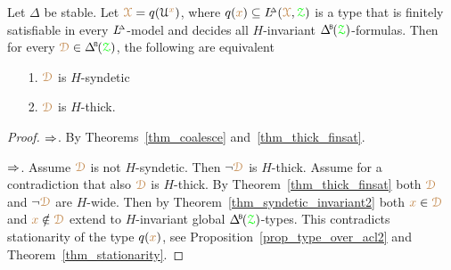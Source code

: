 

\begin{proposition}\label{prop_stable_syndeticiffthick}
  Let $\Delta$ be stable.
  Let ${\color{brown}\EuScript X}=q(\EuScript U^{\color{brown} x})$, where $q({\color{brown} x})\subseteq L\kern-.5ex^{\scriptscriptstyle\Delta}({\color{brown}\EuScript X},{\color{green}\EuScript Z})$ is a type that is finitely satisfiable in every $L\kern-.5ex^{\scriptscriptstyle\Delta}$-model and decides all $H$-invariant $\BDelta(\grZ)$-formulas.
  Then for every $\mrD\in\BDelta(\grZ)$, the following are equivalent
  \begin{itemize}
    \item[1.] ${\color{brown}\EuScript D}$ is $H$-syndetic
    \item[2.] ${\color{brown}\EuScript D}$ is $H$-thick.
  \end{itemize}\smallskip
\end{proposition}

\begin{proof}
  $\Rightarrow$.
  By Theorems~\ref{thm_coalesce} and~\ref{thm_thick_finsat}.

  $\Rightarrow$.
  Assume ${\color{brown}\EuScript D}$ is not $H$-syndetic.
  Then $\neg{\color{brown}\EuScript D}$ is $H$-thick.
  Assume for a contradiction that also ${\color{brown}\EuScript D}$ is $H$-thick.
  By Theorem~\ref{thm_thick_finsat} both ${\color{brown}\EuScript D}$ and $\neg{\color{brown}\EuScript D}$ are $H$-wide.
  Then by Theorem~\ref{thm_syndetic_invariant2} both ${\color{brown} x}\in{\color{brown}\EuScript D}$ and ${\color{brown} x}\notin{\color{brown}\EuScript D}$ extend to $H$-invariant global $\BDelta(\grZ)$-types.
  This contradicts stationarity of the type $q({\color{brown} x})$, see Proposition~\ref{prop_type_over_acl2} and Theorem~\ref{thm_stationarity}.
\end{proof}

